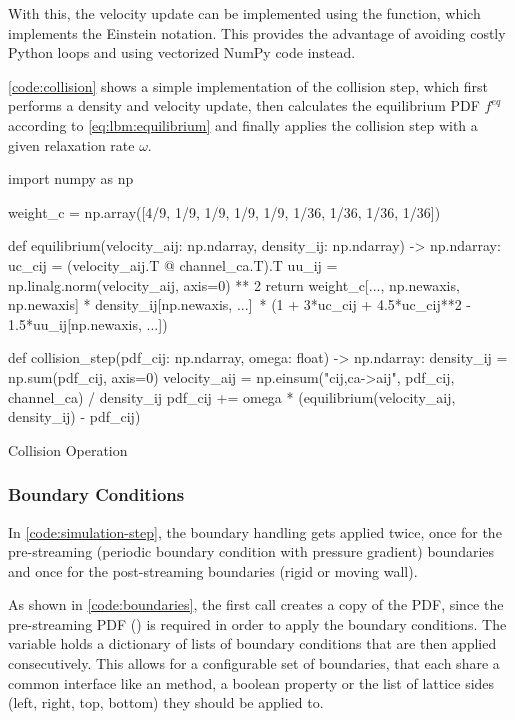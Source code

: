 With this, the velocity update can be implemented using the  function, which implements the Einstein notation. This provides the advantage of avoiding costly Python loops and using vectorized NumPy code instead.

\cref{code:collision} shows a simple implementation of the collision step, which first performs a density and velocity update, then calculates the equilibrium \gls{PDF} $f^{eq}$ according to \cref{eq:lbm:equilibrium} and finally applies the collision step with a given relaxation rate $\omega$.

\begin{listing}[ht!]
    \begin{pycode}
        import numpy as np
    
        weight_c = np.array([4/9, 1/9, 1/9, 1/9, 1/9, 1/36, 1/36, 1/36, 1/36])
    
        def equilibrium(velocity_aij: np.ndarray, density_ij: np.ndarray) -> np.ndarray:
            uc_cij = (velocity_aij.T @ channel_ca.T).T
            uu_ij = np.linalg.norm(velocity_aij, axis=0) ** 2
            return weight_c[..., np.newaxis, np.newaxis] * density_ij[np.newaxis, ...]\
                * (1 + 3*uc_cij + 4.5*uc_cij**2 - 1.5*uu_ij[np.newaxis, ...])
    
        def collision_step(pdf_cij: np.ndarray, omega: float) -> np.ndarray:
            density_ij = np.sum(pdf_cij, axis=0)
            velocity_aij = np.einsum("cij,ca->aij", pdf_cij, channel_ca) / density_ij
            pdf_cij += omega * (equilibrium(velocity_aij, density_ij) - pdf_cij)
    \end{pycode}
    \caption{Collision Operation}
    \label{code:collision}
\end{listing}

\subsubsection{Boundary Conditions}

In \cref{code:simulation-step}, the boundary handling gets applied twice, once for the pre-streaming (periodic boundary condition with pressure gradient) boundaries and once for the post-streaming boundaries (rigid or moving wall).

As shown in \cref{code:boundaries}, the first call creates a copy of the \gls{PDF}, since the pre-streaming \gls{PDF} () is required in order to apply the boundary conditions. The  variable holds a dictionary of lists of boundary conditions that are then applied consecutively. This allows for a configurable set of boundaries, that each share a common interface like an  method, a boolean  property or the list of lattice sides (left, right, top, bottom) they should be applied to.

